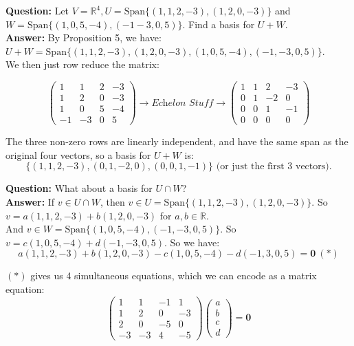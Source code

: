 \begin{examples}\item \textbf{Question:} 
 Let $V = \mathbb{R}^4, U = \text{Span}\{(1,1,2,-3),(1,2,0,-3)\}$  and\\ $W = \text{Span}\{(1,0,5,-4),(-1-3,0,5)\}.$ Find a basis for $U + W.$ \\

\textbf{Answer:} By Proposition 5, we have:\\

 $U + W = \text{Span}\{(1,1,2,-3),(1,2,0,-3),(1,0,5,-4),(-1,-3,0,5)\}$.\\ 
 
 We then just row reduce the matrix:
 
 \[\begin{pmatrix}
 1 & 1 & 2 & -3\\
 1 & 2 & 0 & -3\\
 1 & 0 & 5 & -4\\
 -1 & -3 & 0 & 5
 \end{pmatrix} \rightarrow \textit{Echelon Stuff} \rightarrow
 \begin{pmatrix}
 1 & 1 & 2 & -3\\
 0 & 1 &-2 & 0\\
 0 & 0 & 1 & -1\\
 0 & 0 & 0 & 0
 \end{pmatrix}  \]

The three non-zero rows are linearly independent, and have the same span as the original four vectors, so a basis for $U + W$ is:
\[\{(1,1,2,-3),(0,1,-2,0),(0,0,1,-1)\} \text{ (or just the first 3 vectors).}\]

\item \textbf{Question:} What about a basis for $U \cap W$?\\

\textbf{Answer:} If $v \in U \cap W$, then $v \in U = \text{Span}\{(1,1,2,-3),(1,2,0,-3)\}.$ So $v = a(1,1,2,-3) + b(1,2,0,-3)$ for $a,b \in \mathbb{R}$.\\

 And $v \in W = \text{Span}\{(1,0,5,-4),(-1,-3,0,5)\}$. So $v = c(1,0,5,-4) + d(-1,-3,0,5)$. So we have:
\[a(1,1,2,-3) + b(1,2,0,-3) -c(1,0,5,-4) -d(-1,3,0,5) = \mathbf{0} ~(*)\]

$(*)$ gives us 4 simultaneous equations, which we can encode as a matrix equation:
\[
\begin{pmatrix}
1 & 1 & -1 & 1\\
1 & 2 & 0 & -3\\
2 & 0 & -5 & 0\\
-3 & -3 & 4 & -5
\end{pmatrix}
\begin{pmatrix}
a\\b\\c\\d
\end{pmatrix}
=
\mathbf{0} \]


\end{examples}
